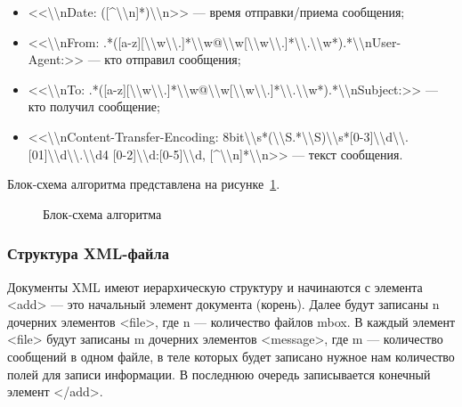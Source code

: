 \begin{itemize}
  \item <<\textbackslash \textbackslash nDate: ([\textasciicircum \textbackslash \textbackslash n]*)\textbackslash \textbackslash n>> --- время отправки/приема сообщения;
  
  \item <<\textbackslash \textbackslash nFrom: .*([a-z][\textbackslash \textbackslash w\textbackslash \textbackslash .]*\textbackslash \textbackslash w@\textbackslash \textbackslash w[\textbackslash \textbackslash w\textbackslash \textbackslash .]*\textbackslash \textbackslash .\textbackslash \textbackslash w*).*\textbackslash \textbackslash nUser-Agent:>> --- кто отправил сообщения;
  
  \item <<\textbackslash \textbackslash nTo: .*([a-z][\textbackslash \textbackslash w\textbackslash \textbackslash .]*\textbackslash \textbackslash w@\textbackslash \textbackslash w[\textbackslash \textbackslash w\textbackslash \textbackslash .]*\textbackslash \textbackslash .\textbackslash \textbackslash w*).*\textbackslash \textbackslash nSubject:>> --- кто получил сообщение;
  
  \item <<\textbackslash \textbackslash nContent-Transfer-Encoding: 8bit\textbackslash \textbackslash s*(\textbackslash \textbackslash S.*\textbackslash \textbackslash S)\textbackslash \textbackslash s*[0-3]\textbackslash \textbackslash d\textbackslash \textbackslash .[01]\textbackslash \textbackslash d\textbackslash \textbackslash .\textbackslash \textbackslash d{4} [0-2]\textbackslash \textbackslash d:[0-5]\textbackslash \textbackslash d, [\textasciicircum \textbackslash \textbackslash n]*\textbackslash \textbackslash n>> --- текст сообщения.
\end{itemize}

Блок-схема алгоритма представлена на рисунке~\ref{teresh_1:teresh_1}.

\begin{figure}[h!]
\caption{Блок-схема алгоритма}
\label{teresh_1:teresh_1}
\end{figure}

\clearpage

\subsubsection{Структура XML-файла}

Документы XML имеют иерархическую структуру и начинаются с элемента <add> --- это начальный элемент документа (корень). Далее будут записаны n дочерних элементов <file>, где n --- количество файлов mbox. В каждый элемент <file> будут записаны m дочерних элементов <message>, где m --- количество сообщений в одном файле, в теле которых будет записано нужное нам количество полей для записи информации. В последнюю очередь записывается конечный элемент </add>.

